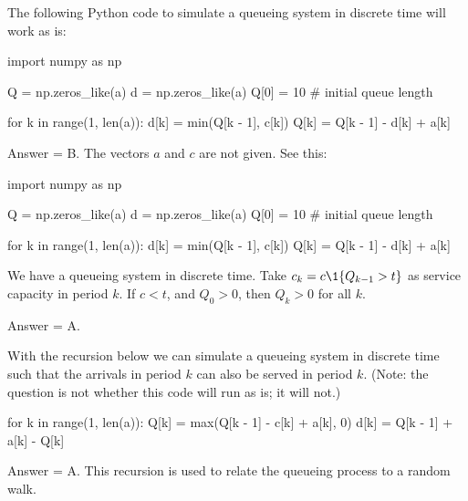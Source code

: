 \begin{exercise}[201902]
The following Python code to simulate a queueing system in discrete time will work as is: 


\begin{pyverbatim}
import numpy as np

Q = np.zeros_like(a)
d = np.zeros_like(a)
Q[0] = 10  # initial queue length

for k in range(1, len(a)):
    d[k] = min(Q[k - 1], c[k])
    Q[k] = Q[k - 1] - d[k] + a[k]

\end{pyverbatim}

\begin{solution}
  Answer = B. The vectors $a$ and $c$ are not given. See this:

\begin{pyconsole}
import numpy as np

Q = np.zeros_like(a)
d = np.zeros_like(a)
Q[0] = 10  # initial queue length

for k in range(1, len(a)):
    d[k] = min(Q[k - 1], c[k])
    Q[k] = Q[k - 1] - d[k] + a[k]

\end{pyconsole}
  
\end{solution}
\end{exercise}

\begin{exercise}[201902]
  We have a queueing system in discrete time. Take $c_k = c\1{Q_{k-1} > t}$ as service capacity in period $k$. If $c < t$, and $Q_0 > 0$, then $Q_k > 0$ for all $k$. 
\begin{solution}
Answer = A.
\end{solution}
\end{exercise}

\begin{exercise}[201902]
  With the recursion below we can simulate a queueing system in discrete time such that the arrivals in period $k$ can also be served in period $k$.
  (Note: the question is not whether this code will run as is; it will not.)
\begin{pyverbatim}
for k in range(1, len(a)):
    Q[k] = max(Q[k - 1] - c[k] + a[k], 0)
    d[k] = Q[k - 1] + a[k] - Q[k]

\end{pyverbatim}

\begin{solution}
Answer = A. This recursion is used to relate the queueing process to a random walk.
\end{solution}
\end{exercise}

